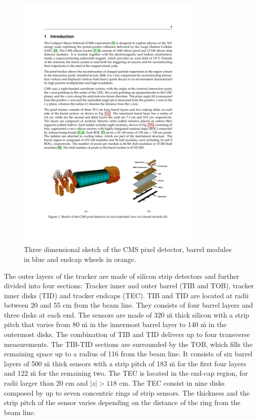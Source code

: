 \begin{figure}
\begin{center}
\includegraphics[angle=-0,width=0.8\textwidth]{2_LHC_and_CMS/pics/pixelfull.pdf}
\caption{Three dimensional sketch of the CMS pixel detector, barrel modules in blue and endcap wheels in orange.
\label{fig:pixel}
}
\end{center}
\end{figure}

The outer layers of the tracker are made of silicon strip detectors and further divided into four sections: Tracker inner and outer barrel (TIB and TOB), tracker inner disks (TID) and tracker endcaps (TEC). TIB and TID are located at radii between 20 and 55 cm from the beam line. They consists of four barrel layers and three disks at each end. The sensors are made of 320 \u m thick silicon with a strip pitch that varies from 80 \u m in the innermost barrel layer to 140 \u m in the outermost disks. The combination of TIB and TID delivers up to four transverse measurements. The TIB-TID sections are surrounded by the TOB, which fills the remaining space up to a radius of 116 from the beam line. It consists of six barrel layers of 500 \u m thick sensors with a strip pitch of 183 \u m for the first four layers and 122 \u m for the remaining two. The TEC is located in the end-cap region, for radii larger than 20 cm and $|z| > 118$ cm. The TEC consist in nine disks composed by up to seven concentric rings of strip sensors. The thickness and the strip pitch of the sensor varies depending on the distance of the ring from the beam line. 

